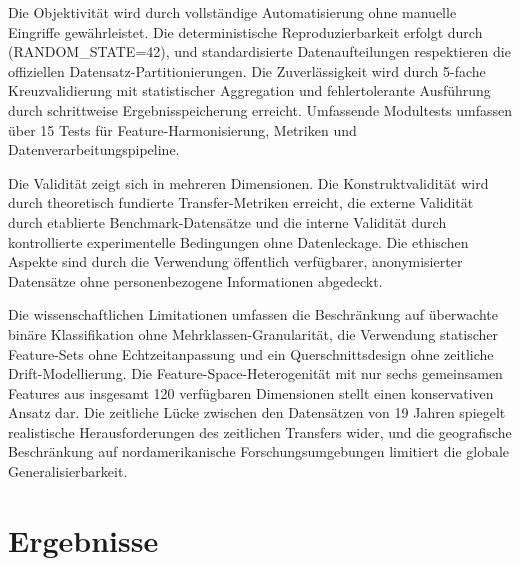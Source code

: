 \documentclass[11pt,a4paper]{article}
\begin{document}
    Die Objektivität wird durch vollständige Automatisierung ohne manuelle Eingriffe gewährleistet. Die deterministische Reproduzierbarkeit erfolgt durch (RANDOM\_STATE=42), und standardisierte Datenaufteilungen respektieren die offiziellen Datensatz-Partitionierungen. Die Zuverlässigkeit wird durch 5-fache Kreuzvalidierung mit statistischer Aggregation und fehlertolerante Ausführung durch schrittweise Ergebnisspeicherung erreicht. Umfassende Modultests umfassen über 15 Tests für Feature-Harmonisierung, Metriken und Datenverarbeitungspipeline.
    
    Die Validität zeigt sich in mehreren Dimensionen. Die Konstruktvalidität wird durch theoretisch fundierte Transfer-Metriken erreicht, die externe Validität durch etablierte Benchmark-Datensätze und die interne Validität durch kontrollierte experimentelle Bedingungen ohne Datenleckage. Die ethischen Aspekte sind durch die Verwendung öffentlich verfügbarer, anonymisierter Datensätze ohne personenbezogene Informationen abgedeckt.

    Die wissenschaftlichen Limitationen umfassen die Beschränkung auf überwachte binäre Klassifikation ohne Mehrklassen-Granularität, die Verwendung statischer Feature-Sets ohne Echtzeitanpassung und ein Querschnittsdesign ohne zeitliche Drift-Modellierung. Die Feature-Space-Heterogenität mit nur sechs gemeinsamen Features aus insgesamt 120 verfügbaren Dimensionen stellt einen konservativen Ansatz dar. Die zeitliche Lücke zwischen den Datensätzen von 19 Jahren spiegelt realistische Herausforderungen des zeitlichen Transfers wider, und die geografische Beschränkung auf nordamerikanische Forschungsumgebungen limitiert die globale Generalisierbarkeit.
    \section{Ergebnisse}
\end{document}
